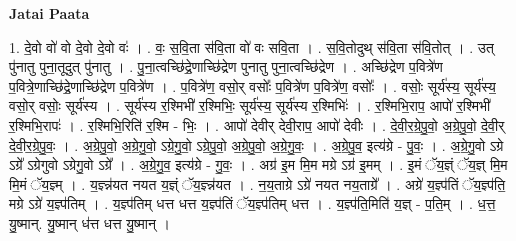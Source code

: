 \documentclass[17pt]{extarticle}
\begin{document}
\textbf{Jatai Paata} \newline

1. दे॒वो वो॑ वो दे॒वो दे॒वो वः॑ । . वः॒ स॒वि॒ता स॑वि॒ता वो॑ वः सवि॒ता । . स॒वि॒तोदुथ् स॑वि॒ता स॑वि॒तोत् । . उत् पु॑नातु पुना॒तूदुत् पु॑नातु । . पु॒ना॒त्वच्छि॑द्रे॒णाच्छि॑द्रेण पुनातु पुना॒त्वच्छि॑द्रेण । . अच्छि॑द्रेण प॒वित्रे॑ण प॒वित्रे॒णाच्छि॑द्रे॒णाच्छि॑द्रेण प॒वित्रे॑ण । . प॒वित्रे॑ण॒ वसो॒र् वसोः᳚ प॒वित्रे॑ण प॒वित्रे॑ण॒ वसोः᳚ । . वसोः॒ सूर्य॑स्य॒ सूर्य॑स्य॒ वसो॒र् वसोः॒ सूर्य॑स्य । . सूर्य॑स्य र॒श्मिभी॑ र॒श्मिभिः॒ सूर्य॑स्य॒ सूर्य॑स्य र॒श्मिभिः॑ । . र॒श्मिभि॒राप॒ आपो॑ र॒श्मिभी॑ र॒श्मिभि॒रापः॑ । . र॒श्मिभि॒रिति॑ र॒श्मि - भिः॒ । . आपो॑ देवीर् देवी॒राप॒ आपो॑ देवीः । . दे॒वी॒र॒ग्रे॒पु॒वो॒ अ॒ग्रे॒पु॒वो॒ दे॒वी॒र् दे॒वी॒र॒ग्रे॒पु॒वः॒ । . अ॒ग्रे॒पु॒वो॒ अ॒ग्रे॒गु॒वो॒ ऽग्रे॒गु॒वो॒ ऽग्रे॒पु॒वो॒ अ॒ग्रे॒पु॒वो॒ अ॒ग्रे॒गु॒वः॒ । . अ॒ग्रे॒पु॒व॒ इत्य॑ग्रे - पु॒वः॒ । . अ॒ग्रे॒गु॒वो ऽग्रे ऽग्रे᳚ ऽग्रेगुवो ऽग्रेगु॒वो ऽग्रे᳚ । . अ॒ग्रे॒गु॒व॒ इत्य॑ग्रे - गु॒वः॒ । . अग्र॑ इ॒म मि॒म मग्रे ऽग्र॑ इ॒मम् । . इ॒मं ॅय॒ज्ञ्ं ॅय॒ज्ञ् मि॒म मि॒मं ॅय॒ज्ञ्म् । . य॒ज्ञ्न्न॑यत नयत य॒ज्ञ्ं ॅय॒ज्ञ्न्न॑यत । . न॒य॒ताग्रे ऽग्रे॑ नयत नय॒ताग्रे᳚ । . अग्रे॑ य॒ज्ञ्प॑तिं ॅय॒ज्ञ्प॑ति॒ मग्रे ऽग्रे॑ य॒ज्ञ्प॑तिम् । . य॒ज्ञ्प॑तिम् धत्त धत्त य॒ज्ञ्प॑तिं ॅय॒ज्ञ्प॑तिम् धत्त । . य॒ज्ञ्प॑ति॒मिति॑ य॒ज्ञ् - प॒ति॒म् । . ध॒त्त॒ यु॒ष्मान्. यु॒ष्मान् ध॑त्त धत्त यु॒ष्मान् । \newline
\end{document}
